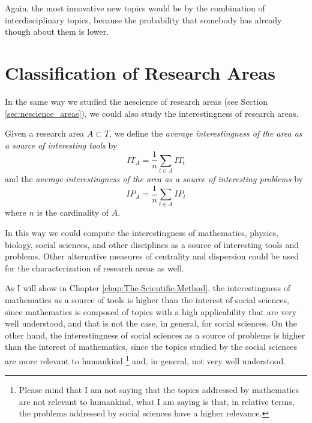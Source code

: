 Again, the most innovative new topics would be by the combination of interdisciplinary topics, because the probability that somebody has already though about them is lower.

%
%

\section{Classification of Research Areas}

In the same way we studied the nescience of research areas (see Section \ref{sec:nescience_areas}), we could also study the interestingness of research areas.

\begin{definition}
Given a research area $A\subset T$, we define the \emph{average interestingness
of the area as a source of interesting tools} by
\[
IT_{A}=\frac{1}{n}\sum_{t\in A}IT_{t}
\]
and the \emph{average interestingness of the area as a source of interesting
problems} by
\[
IP_{A}=\frac{1}{n}\sum_{t\in A}IP_{t}
\]
where $n$ is the cardinality of $A$.
\end{definition}

In this way we could compute the interestingness of mathematics, physics, biology, social sciences, and other disciplines as a source of interesting tools and problems. Other alternative measures of centrality and dispersion could be used for the characterization of research areas as well.

As I will show in Chapter \ref{chap:The-Scientific-Method}, the interestingness of mathematics as a source of tools is higher than the interest of social sciences, since mathematics is composed of topics with a high applicability that are very well understood, and that is not the case, in general, for social sciences. On the other hand, the interestingness of social sciences as a source of problems is higher than the interest of mathematics, since the topics studied by the social sciences are more relevant to humankind \footnote{Please mind that I am not saying that the topics addressed by mathematics are not relevant to humankind, what I am saying is that, in relative terms, the problems addressed by social sciences have a higher relevance.} and, in general, not very well understood.

